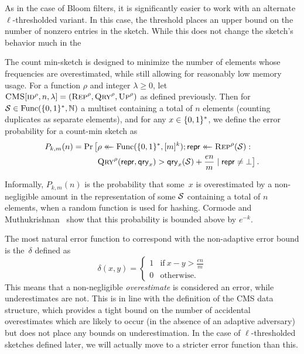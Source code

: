 As in the case of Bloom filters, it is significantly easier to work with an
alternate $\ell$-thresholded variant. In this case, the threshold places an
upper bound on the number of nonzero entries in the sketch. While this does not
change the sketch's behavior much in the 

%
The count min-sketch is designed to minimize the number of elements whose
frequencies are overestimated, while still allowing for reasonably low memory
usage. For a function $\rho$ and integer $\lambda\ge0$, let
$\textnormal{\textsc{CMS}}[\textnormal{\textsc{id}}^\rho,n,\lambda] = (\textnormal{\textsc{Rep}}^\rho,\textnormal{\textsc{Qry}}^\rho,\textnormal{\textsc{Up}}^\rho)$ as defined
previously. Then for $\mathcal{S} \in \mathrm{Func}(\{0,1\}^*,\mathbb{N})$  a multiset containing a total
of $n$ elements (counting duplicates as separate elements), and for any
$x \in \{0,1\}^*$, we define the error probability for a count-min sketch as
\begin{equation}\label{eq:bf-fp}
  \begin{aligned}
    P_{k,m}(n) =
      \Pr\big[&\rho \mathrel{\leftarrow\mkern-14mu\leftarrow} \mathrm{Func}(\{0,1\}^*,[m]^k);
              \mathsf{repr} \mathrel{\leftarrow\mkern-14mu\leftarrow} \textnormal{\textsc{Rep}}^\rho(\mathcal{S}): \\
              &\textnormal{\textsc{Qry}}^\rho(\mathsf{repr}, \mathsf{qry}_x) > \mathsf{qry}_x(\mathcal{S})+\frac{en}{m} \mid \mathsf{repr} \ne \bot
      \big] \,.
  \end{aligned}
\end{equation}


Informally, $P_{k,m}(n)$ is the probability that some~$x$ is overestimated by a
non-negligible amount in the representation of some $\mathcal{S}$ containing a total
of $n$ elements, when a random function is used for hashing. Cormode and
Muthukrishnan~\cite{cormode2005improved} show that this probability is bounded
above by $e^{-k}$.

%
%
The most natural error function to correspond with the non-adaptive error bound
is the~$\delta$ defined as
\begin{equation}
  \delta(x, y) =
  \begin{cases}
    1 & \text{if}\ x - y > \frac{en}{m} \\
    0 & \text{otherwise.}
  \end{cases}
\end{equation}
%
%
This means that a non-negligible \emph{overestimate} is considered an error,
while underestimates are not. This is in line with the definition of the CMS
data structure, which provides a tight bound on the number of accidental
overestimates which are likely to occur (in the absence of an adaptive
adversary) but does not place any bounds on underestimation. In the case of
$\ell$-thresholded sketches defined later, we will actually move to a stricter
error function than this.

